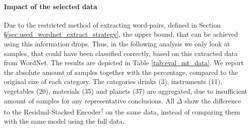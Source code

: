 \paragraph*{Impact of the selected data}
Due to the restricted method of extracting word-pairs, defined in Section §\ref{sec:used_wordnet_extract_strategy}, the upper bound, that can be achieved using this information drops. Thus, in the following analysis we only look at samples, that could have been classified correctly, based on this extracted data from WordNet. The results are depicted in Table \ref{tab:eval_mt_data}. We report the absolute amount of samples together with the percentage, compared to the original size of each category. The categories drinks (3), instruments (11), vegetables (20), materials (35) and planets (37) are aggregated, due to insufficient amount of samples for any representative conclusions. All $\Delta$ show the difference to the Residual-Stacked Encoder\textsuperscript{$\dagger$} on the same data, instead of comparing them with the same model using the full data.
